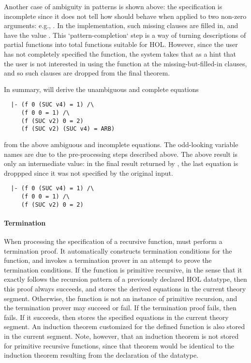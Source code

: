  Another case of ambiguity in patterns is shown above: the specification
is incomplete since it does not tell how  should behave when
applied to two non-zero arguments: e.g., . In the
implementation, such missing clauses are filled in, and have the value
. This `pattern-completion` step is a way of turning descriptions
of partial functions into total functions suitable for HOL. However,
since the user has not completely specified the function, the system
takes that as a hint that the user is not interested in using the
function at the missing-but-filled-in clauses, and so such clauses are
dropped from the final theorem.

In summary,  will derive the unambiguous and complete
equations
%
\begin{hol}
\begin{verbatim}
  |- (f 0 (SUC v4) = 1) /\
     (f 0 0 = 1) /\
     (f (SUC v2) 0 = 2)
     (f (SUC v2) (SUC v4) = ARB)
\end{verbatim}
\end{hol}
%
from the above ambiguous and incomplete equations. The odd-looking
variable names are due to the pre-processing steps described above. The
above result is only an intermediate value: in the final result returned
by \ml{Define}, the last equation is droppped since it was not
specified by the original input.
\begin{hol}
\begin{verbatim}
  |- (f 0 (SUC v4) = 1) /\
     (f 0 0 = 1) /\
     (f (SUC v2) 0 = 2)
\end{verbatim}
\end{hol}

\paragraph{Termination}

When processing the specification of a recursive function, 
must perform a termination proof. It automatically constructs
termination conditions for the function, and invokes a termination
prover in an attempt to prove the termination conditions.  If the
function is primitive recursive, in the sense that it exactly follows
the recursion pattern of a previously declared HOL datatype, then this
proof always succeeds, and  stores the derived equations in
the current theory segment.
Otherwise, the function is not an
instance of primitive recursion, and the termination prover may
succeed or fail. If the termination proof fails, then  fails.
If it succeeds, then \ml{Define} stores the specified equations in the
current theory segment. An induction theorem customized for the defined
function is also stored in the current segment. Note, however, that an
induction theorem is not stored for primitive recursive functions, since
that theorem would be identical to the induction theorem resulting from
the declaration of the datatype.


